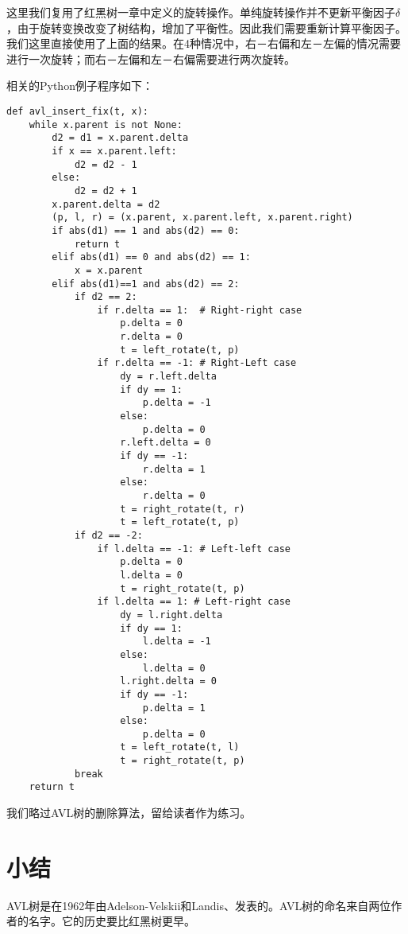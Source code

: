 \documentclass[UTF8]{article}
\begin{document}
这里我们复用了红黑树一章中定义的旋转操作。单纯旋转操作并不更新平衡因子$\delta$，由于旋转变换改变了树结构，增加了平衡性。因此我们需要重新计算平衡因子。我们这里直接使用了上面的结果。在4种情况中，右－右偏和左－左偏的情况需要进行一次旋转；而右－左偏和左－右偏需要进行两次旋转。

相关的Python例子程序如下：

\begin{lstlisting}
def avl_insert_fix(t, x):
    while x.parent is not None:
        d2 = d1 = x.parent.delta
        if x == x.parent.left:
            d2 = d2 - 1
        else:
            d2 = d2 + 1
        x.parent.delta = d2
        (p, l, r) = (x.parent, x.parent.left, x.parent.right)
        if abs(d1) == 1 and abs(d2) == 0:
            return t
        elif abs(d1) == 0 and abs(d2) == 1:
            x = x.parent
        elif abs(d1)==1 and abs(d2) == 2:
            if d2 == 2:
                if r.delta == 1:  # Right-right case
                    p.delta = 0
                    r.delta = 0
                    t = left_rotate(t, p)
                if r.delta == -1: # Right-Left case
                    dy = r.left.delta
                    if dy == 1:
                        p.delta = -1
                    else:
                        p.delta = 0
                    r.left.delta = 0
                    if dy == -1:
                        r.delta = 1
                    else:
                        r.delta = 0
                    t = right_rotate(t, r)
                    t = left_rotate(t, p)
            if d2 == -2:
                if l.delta == -1: # Left-left case
                    p.delta = 0
                    l.delta = 0
                    t = right_rotate(t, p)
                if l.delta == 1: # Left-right case
                    dy = l.right.delta
                    if dy == 1:
                        l.delta = -1
                    else:
                        l.delta = 0
                    l.right.delta = 0
                    if dy == -1:
                        p.delta = 1
                    else:
                        p.delta = 0
                    t = left_rotate(t, l)
                    t = right_rotate(t, p)
            break
    return t
\end{lstlisting}

我们略过AVL树的删除算法，留给读者作为练习。

\section{小结}
AVL树是在1962年由Adelson-Velskii和Landis\cite{wiki}、\cite{TFATP}发表的。AVL树的命名来自两位作者的名字。它的历史要比红黑树更早。
\end{document}
